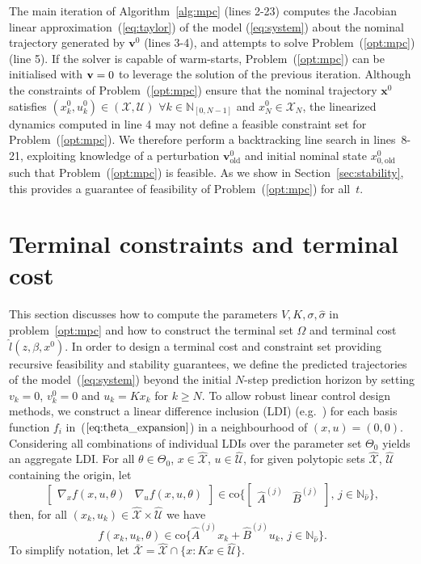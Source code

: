 \documentclass{IEEEtran}
\theoremstyle{definition}
\theoremstyle{remark}
\begin{document}
The main iteration of Algorithm~\ref{alg:mpc} (lines 2-23) computes the Jacobian linear approximation~(\ref{eq:taylor}) of the model (\ref{eq:system}) about the nominal trajectory generated by $\mathbf{v}^0$ (lines 3-4), and attempts to solve Problem~(\ref{opt:mpc}) (line 5).
%
If the solver is capable of warm-starts, Problem~(\ref{opt:mpc}) can be initialised with ${\bf v} =0$ to leverage the solution of the previous iteration.
%
Although the constraints of Problem~(\ref{opt:mpc}) ensure that 
the nominal trajectory $\mathbf{x}^0$
satisfies $(x_k^0,u_k^0) \in (\mathcal{X},\mathcal{U})$ $\forall k\in \mathbb{N}_{[0,N-1]}$ and $x_{N}^0 \in \mathcal{X}_N$, the linearized dynamics computed in line 4 may not define a feasible constraint set for Problem~(\ref{opt:mpc}). We therefore perform a backtracking line search in lines~8-21,  exploiting knowledge of a perturbation $\mathbf{v}^0_{\mathrm{old}}$ and initial nominal state $x^0_{0,\mathrm{old}}$ such that Problem~(\ref{opt:mpc}) is feasible. As we show in Section~\ref{sec:stability}, this provides a guarantee of feasibility of Problem~(\ref{opt:mpc}) for all~$t$.

\section{Terminal constraints and terminal cost} \label{sec:termset}
This section discusses how to compute the parameters $V,K,\sigma,\hat{\sigma}$ in problem~\eqref{opt:mpc}
and how to construct the terminal set $\Omega$ and terminal cost $\hat{l}(z,\beta,x^0)$.
%
In order to design a terminal cost and constraint set providing recursive feasibility and stability guarantees, we define the predicted trajectories of the model~(\ref{eq:system}) beyond the initial $N$-step prediction horizon by setting $v_k = 0$, $v^0_k = 0$ and $u_k=K x_k$ for  $k\geq N$.
%
To allow robust linear control design methods, we construct a linear difference inclusion (LDI) (e.g.~\cite{Boy94}) for each basis function $f_i$ in~($\ref{eq:theta_expansion}$) in a neighbourhood of $(x,u)=(0,0)$. Considering all combinations of individual LDIs over the parameter set $\Theta_0$ yields an aggregate LDI. 
%
For all $\theta \in \Theta_0$, 
$x\in\hat{\mathcal{X}}$, $u\in\hat{\mathcal{U}}$,
for given polytopic sets $\hat{\mathcal{X}}$, $\hat{\mathcal{U}}$ containing the origin, let
\[
[\begin{matrix}
\nabla_x f(x, u, \theta) & \nabla_u f(x,u,\theta)\end{matrix}] 
\in \mathrm{co} \bigl\{ [\begin{matrix}\hat{A}^{(j)}  & \hat{B}^{(j)} \end{matrix}], \, j \in \mathbb{N}_{\hat{\nu}} \bigr\} ,
\]
then, for all $(x_k,u_k)\in\hat{\mathcal{X}}\times\hat{\mathcal{U}}$ we have
\begin{equation}
f(x_k,u_k,\theta) \in\mathrm{co}\{\hat{A}^{(j)} x_k + \hat{B}^{(j)} u_k, \, j \in \mathbb{N}_{\hat{\nu}} \} .
\label{eq:ldi_term}
\end{equation} 
To simplify notation, let $\bar{\mathcal{X}} = \hat{\mathcal{X}}\cap\{x: Kx \in \mathcal{\hat{U}}\}$.
\end{document}
